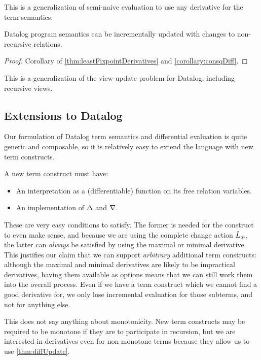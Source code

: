 This is a generalization of semi-naive evaluation to use any derivative for the
term semantics.

\begin{thm}
\label{thm:diffUpdate}
  Datalog program semantics can be incrementally updated with changes to non-recursive relations.
\end{thm}
\ifproofs
\begin{proof}
  Corollary of \cref{thm:leastFixpointDerivatives} and \cref{corollary:consqDiff}.
\end{proof}
\fi

This is a generalization of the view-update problem for Datalog, including recursive views.

\subsection{Extensions to Datalog}
\label{sec:extensions}

Our formulation of Datalog term semantics and differential evaluation is quite
generic and composable, so it is relatively easy to extend the language with new
term constructs.

A new term construct must have:
\begin{itemize}
  \item An interpretation as a (differentiable) function on its free relation variables.
  \item An implementation of $\Delta$ and $\nabla$.
\end{itemize}

These are very easy conditions to satisfy. The former is needed for the construct to even
make sense, and because we are using the complete change action
$\hat{L}_\circledast$, the latter can \emph{always} be satisfied by using the maximal or
minimal derivative. This justifies our claim that we can support
\emph{arbitrary} additional term constructs: although the maximal and minimal
derivatives are likely to be impractical derivatives, having them
available as options means that we can still work them into the overall process.
Even if we have a term construct which we cannot find a good derivative for, we only lose incremental
evaluation for those subterms, and not for anything else.

This does not say anything about monotonicity. New term constructs may
be required to be monotone if they are to participate in recursion, but we are
interested in derivatives even for non-monotone terms because they allow us to
use \cref{thm:diffUpdate}.


